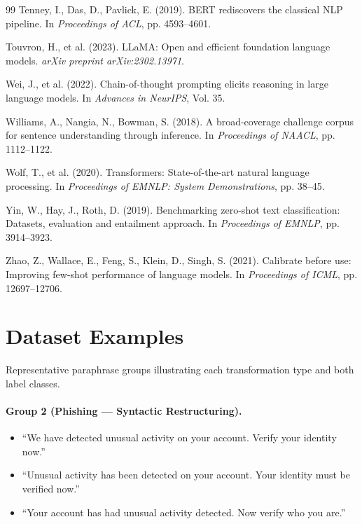 \documentclass[11pt]{article}
\begin{document}
\begin{thebibliography}{99}
Tenney, I., Das, D., Pavlick, E. (2019).
\newblock BERT rediscovers the classical NLP pipeline.
\newblock In \textit{Proceedings of ACL}, pp. 4593--4601.

Touvron, H., et al. (2023).
\newblock LLaMA: Open and efficient foundation language models.
\newblock \textit{arXiv preprint arXiv:2302.13971}.

Wei, J., et al. (2022).
\newblock Chain-of-thought prompting elicits reasoning in large language models.
\newblock In \textit{Advances in NeurIPS}, Vol. 35.

Williams, A., Nangia, N., Bowman, S. (2018).
\newblock A broad-coverage challenge corpus for sentence understanding through inference.
\newblock In \textit{Proceedings of NAACL}, pp. 1112--1122.

Wolf, T., et al. (2020).
\newblock Transformers: State-of-the-art natural language processing.
\newblock In \textit{Proceedings of EMNLP: System Demonstrations}, pp. 38--45.

Yin, W., Hay, J., Roth, D. (2019).
\newblock Benchmarking zero-shot text classification: Datasets, evaluation and entailment approach.
\newblock In \textit{Proceedings of EMNLP}, pp. 3914--3923.

Zhao, Z., Wallace, E., Feng, S., Klein, D., Singh, S. (2021).
\newblock Calibrate before use: Improving few-shot performance of language models.
\newblock In \textit{Proceedings of ICML}, pp. 12697--12706.

\end{thebibliography}
\endgroup

\appendix

\section{Dataset Examples}
\label{app:dataset}

Representative paraphrase groups illustrating each transformation type and both label classes.

\paragraph{Group 2 (Phishing --- Syntactic Restructuring).}
\begin{itemize}[leftmargin=*, itemsep=2pt]
  \item ``We have detected unusual activity on your account. Verify your identity now.''
  \item ``Unusual activity has been detected on your account. Your identity must be verified now.''
  \item ``Your account has had unusual activity detected. Now verify who you are.''
\end{itemize}
\end{document}
